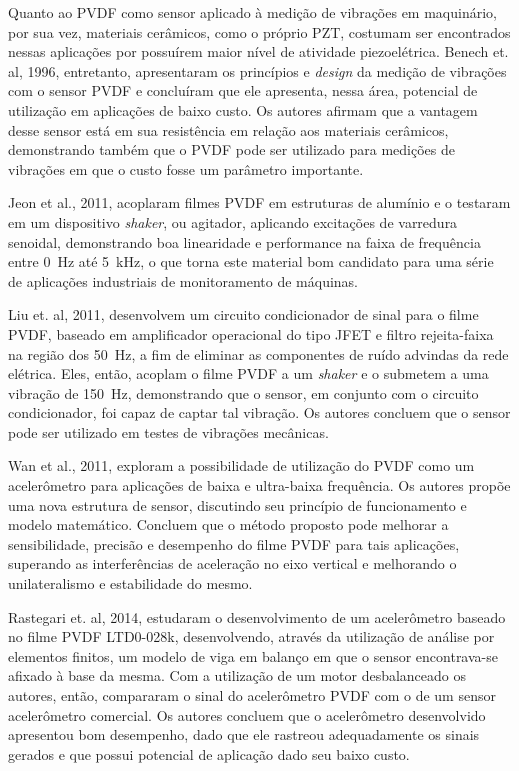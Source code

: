 \documentclass[
	12pt,				
	oneside,			
	a4paper,			
	english,			
	brazil,	
	sumario=abnt-6027-2012		
	]{abntex2ppgsi}
\begin{document}
Quanto ao PVDF como sensor aplicado à medição de vibrações em maquinário, por sua vez, materiais cerâmicos, como o próprio PZT, costumam ser encontrados nessas aplicações por possuírem maior nível de atividade piezoelétrica. Benech et. al, 1996, entretanto, apresentaram os princípios e \textit{design} da medição de vibrações com o sensor PVDF e concluíram que ele apresenta, nessa área, potencial de utilização em aplicações de baixo custo. Os autores afirmam que a vantagem desse sensor está em sua resistência em relação aos materiais cerâmicos, demonstrando também que o PVDF pode ser utilizado para medições de vibrações em que o custo fosse um parâmetro importante. 

Jeon et al., 2011, acoplaram filmes PVDF em estruturas de alumínio e o testaram em um dispositivo \textit{shaker}, ou agitador, aplicando excitações de varredura senoidal, demonstrando boa linearidade e performance na faixa de frequência entre \SI{0}{\hertz} até \SI{5}{\kilo\hertz}, o que torna este material bom candidato para uma série de aplicações industriais de monitoramento de máquinas.

Liu et. al, 2011, desenvolvem um circuito condicionador de sinal para o filme PVDF, baseado em amplificador operacional do tipo JFET e filtro rejeita-faixa na região dos \SI{50}{\hertz}, a fim de eliminar as componentes de ruído advindas da rede elétrica. Eles, então, acoplam o filme PVDF a um \textit{shaker} e o submetem a uma vibração de \SI{150}{\hertz}, demonstrando que o sensor, em conjunto com o circuito condicionador, foi capaz de captar tal vibração. Os autores concluem que o sensor pode ser utilizado em testes de vibrações mecânicas. 

Wan et al., 2011, exploram a possibilidade de utilização do PVDF como um acelerômetro para aplicações de baixa e ultra-baixa frequência. Os autores propõe uma nova estrutura de sensor, discutindo seu princípio de funcionamento e modelo matemático. Concluem que o método proposto pode melhorar a sensibilidade, precisão e desempenho do filme PVDF para tais aplicações, superando as interferências de aceleração no eixo vertical e melhorando o unilateralismo e estabilidade do mesmo.

Rastegari et. al, 2014, estudaram o desenvolvimento de um acelerômetro baseado no filme PVDF LTD0-028k, desenvolvendo, através da utilização de análise por elementos finitos, um modelo de viga em balanço em que o sensor encontrava-se afixado à base da mesma. Com a utilização de um motor desbalanceado os autores, então, compararam o sinal do acelerômetro PVDF com o de um sensor acelerômetro comercial. Os autores concluem que o acelerômetro desenvolvido apresentou bom desempenho, dado que ele rastreou adequadamente os sinais gerados e que possui potencial de aplicação dado seu baixo custo. 
\end{document}
